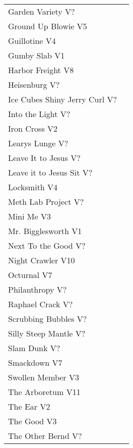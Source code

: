 \begin{center}
\begin{supertabular}{lr}
Garden Variety V? & \pageref{rt:Garden Variety} \\
Ground Up Blowie V5 & \pageref{rt:Ground Up Blowie} \\
Guillotine V4 & \pageref{rt:Guillotine} \\
Gumby Slab V1 & \pageref{rt:Gumby Slab} \\
Harbor Freight V8 & \pageref{vr:Harbor Freight} \\
Heisenburg V? & \pageref{rt:Heisenburg} \\
Ice Cubes Shiny Jerry Curl V? & \pageref{rt:Ice Cubes Shiny Jerry Curl} \\
Into the Light V? & \pageref{rt:Into the Light} \\
Iron Cross V2 & \pageref{vr:Iron Cross} \\
Learys Lunge V? & \pageref{rt:Learys Lunge} \\
Leave It to Jesus V? & \pageref{rt:Leave It to Jesus} \\
Leave it to Jesus Sit V? & \pageref{vr:Leave it to Jesus Sit} \\
Locksmith V4 & \pageref{rt:Locksmith} \\
Meth Lab Project V? & \pageref{rt:Meth Lab Project} \\
Mini Me V3 & \pageref{rt:Mini Me} \\
Mr. Bigglesworth V1 & \pageref{vr:Mr. Bigglesworth} \\
Next To the Good V? & \pageref{rt:Next To the Good} \\
Night Crawler V10 & \pageref{rt:Night Crawler} \\
Octurnal V7 & \pageref{rt:Octurnal} \\
Philanthropy V? & \pageref{rt:Philanthropy} \\
Raphael Crack V? & \pageref{rt:Raphael Crack} \\
Scrubbing Bubbles V? & \pageref{rt:Scrubbing Bubbles} \\
Silly Steep Mantle V? & \pageref{rt:Silly Steep Mantle} \\
Slam Dunk V? & \pageref{rt:Slam Dunk} \\
Smackdown V7 & \pageref{rt:Smackdown} \\
Swollen Member V3 & \pageref{rt:Swollen Member} \\
The Arboretum V11 & \pageref{rt:The Arboretum} \\
The Ear V2 & \pageref{rt:The Ear} \\
The Good V3 & \pageref{rt:The Good} \\
The Other Bernd V? & \pageref{rt:The Other Bernd} \\

\end{supertabular}
\end{center}
